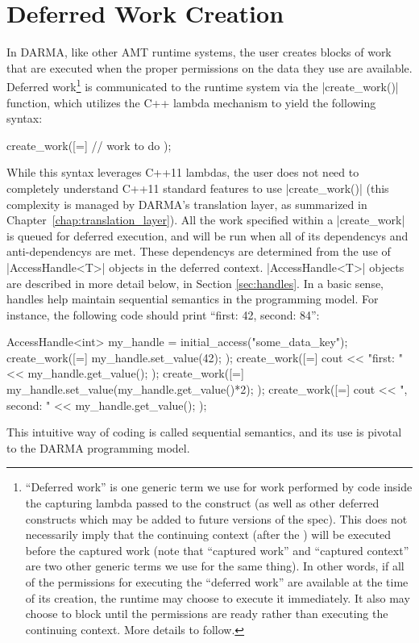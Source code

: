 \lstMakeShortInline[style=CppCodeInlineStyle]{|}
\section{Deferred Work Creation}
\label{sec:deferred}
In DARMA, like other AMT runtime systems, the user creates blocks of work that
are executed when the proper permissions on the data they use are available.
Deferred work\footnote{``Deferred work'' is one generic term we use for work
performed by code inside the capturing lambda passed to the
 construct (as well as other deferred constructs which
may be added to future versions of the spec).  This does not necessarily imply
that the continuing context (after the ) will be
executed before the captured work (note that ``captured work'' and ``captured
context'' are two other generic terms we use for the same thing).  In other
words, if all of the permissions for executing the ``deferred work'' are
available at the time of its creation, the runtime may choose to execute it
immediately.  It also may choose to block until the permissions are ready rather
than executing the continuing context.  More details to follow.} is communicated
to the runtime system via the |create_work()| function, which utilizes the C++
lambda mechanism to yield the following syntax:
\begin{CppCode}
  create_work([=]{
    // work to do
  });
\end{CppCode}

While this syntax leverages C++11 lambdas, the user does not need to
completely understand C++11 standard features to use |create_work()|
(this complexity is managed by DARMA's translation layer, as summarized in
Chapter~\ref{chap:translation_layer}). All the work specified within a
|create_work| is queued for deferred execution, and will be run when
all of its \glspl{dependency} and \glspl{anti-dependency} are met.  
These \glspl{dependency} are determined from the use of 
|AccessHandle<T>| objects in the deferred context. 
|AccessHandle<T>| objects are described in more detail below, in
Section \ref{sec:handles}.  In a basic sense, handles help maintain
\gls{sequential semantics} in the programming model.  For instance, the
following code should print ``first: 42, second: 84'':
\begin{CppCode}
AccessHandle<int> my_handle = initial_access("some_data_key");
create_work([=]{
  my_handle.set_value(42);
});
create_work([=]{
  cout << "first: " << my_handle.get_value();
});
create_work([=]{
  my_handle.set_value(my_handle.get_value()*2);
});
create_work([=]{
  cout << ", second: " << my_handle.get_value();
});
\end{CppCode}
This intuitive way of coding is called \gls{sequential semantics}, 
and its use is pivotal to the DARMA programming model.

